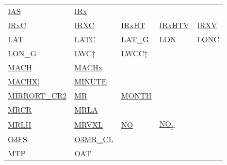 \documentclass[
  english,
]{book}
\begin{document}
\begin{longtable}[]{@{}lllll@{}}
\href{/rmd_output/1/10-obsolete-variables.html\#ias}{IAS} & \href{/rmd_output/1/10-obsolete-variables.html\#irx}{IRx} & & & \\
\href{/rmd_output/1/8-radiation-variables.html\#irxc}{IRxC} & \href{/rmd_output/1/8-radiation-variables.html\#irxc}{IRXC} & \href{/rmd_output/1/8-radiation-variables.html\#irxht}{IRxHT} & \href{/rmd_output/1/8-radiation-variables.html\#irxht}{IRxHTV} & \href{/rmd_output/1/8-radiation-variables.html\#irxv}{IRXV} \\
\href{/rmd_output/1/3-the-state-of-the-aircraft.html\#latitude}{LAT} & \href{/rmd_output/1/3-the-state-of-the-aircraft.html\#latc-lonc}{LATC} & \href{/rmd_output/1/3-the-state-of-the-aircraft.html\#gglat}{LAT\_G} & \href{/rmd_output/1/3-the-state-of-the-aircraft.html\#longitude}{LON} & \href{/rmd_output/1/3-the-state-of-the-aircraft.html\#latc-lonc}{LONC} \\
\href{/rmd_output/1/3-the-state-of-the-aircraft.html\#gglon}{LON\_G} & \href{/rmd_output/1/10-obsolete-variables.html\#jwlwc}{LWC\(\ddagger\)} & \href{/rmd_output/1/10-obsolete-variables.html\#jwlw-corrected}{LWCC\(\ddagger\)} & & \\
\href{/rmd_output/1/4-the-state-of-the-atmosphere.html\#mach-number}{MACH} & \href{/rmd_output/1/4-the-state-of-the-atmosphere.html\#mach-number}{MACHx} & & & \\
\href{/rmd_output/1/4-the-state-of-the-atmosphere.html\#mach-number}{MACHX}{]} & \href{/rmd_output/1/2-general-information-about-data-files.html\#hms}{MINUTE} & & & \\
\href{/rmd_output/1/4-the-state-of-the-atmosphere.html\#mirror-cr2}{MIRRORT\_CR2} & \href{/rmd_output/1/4-the-state-of-the-atmosphere.html\#MR}{MR} & \href{/rmd_output/1/2-general-information-about-data-files.html\#mdy}{MONTH} & & \\
\href{/rmd_output/1/4-the-state-of-the-atmosphere.html\#MR}{MRCR} & \href{/rmd_output/1/4-the-state-of-the-atmosphere.html\#MR}{MRLA} & & & \\
\href{/rmd_output/1/4-the-state-of-the-atmosphere.html\#MR}{MRLH} & \href{/rmd_output/1/4-the-state-of-the-atmosphere.html\#MR}{MRVXL} & \href{/rmd_output/1/6-air-chemistry-measurements.html\#no-noy}{NO} & \href{/rmd_output/1/6-air-chemistry-measurements.html\#no-noy}{NO\textsubscript{y}} & \\
\href{/rmd_output/1/10-obsolete-variables.html\#o3fs}{O3FS} & \href{/rmd_output/1/6-air-chemistry-measurements.html\#f03-acd}{O3MR\_CL} & & & \\
\href{/rmd_output/1/4-the-state-of-the-atmosphere.html\#special-use-remote}{MTP} & \href{/rmd_output/1/4-the-state-of-the-atmosphere.html\#oat}{OAT} & & & \\

\end{longtable}
\end{document}
